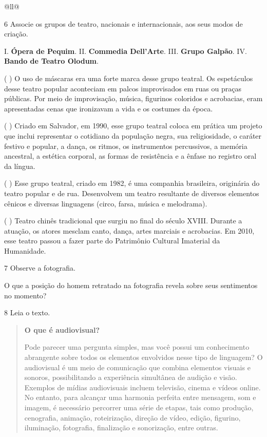\begin{itemize}
\begin{itemize}
\begin{escolha}[]{@{}ll@{}}

\num{6} Associe os grupos de teatro, nacionais e internacionais, aos seus modos de criação.

I. \textbf{Ópera de Pequim}.
II. \textbf{Commedia Dell'Arte}.
III. \textbf{Grupo Galpão}.
IV. \textbf{Bando de Teatro Olodum}.

(  ) O uso de máscaras era uma forte marca desse grupo teatral. Os
espetáculos desse teatro popular aconteciam em palcos improvisados em
ruas ou praças públicas. Por meio de improvisação, música, figurinos
coloridos e acrobacias, eram apresentadas cenas que ironizavam a vida e
os costumes da época.

(  ) Criado em Salvador, em 1990, esse grupo teatral coloca em prática um
projeto que inclui representar o cotidiano da população negra, sua
religiosidade, o caráter festivo e popular, a dança, os ritmos, os
instrumentos percussivos, a memória ancestral, a estética corporal, as
formas de resistência e a ênfase no registro oral da língua.

(  ) Esse grupo teatral, criado em 1982, é uma companhia brasileira,
originária do teatro popular e de rua. Desenvolvem um teatro resultante
de diversos elementos cênicos e diversas linguagens (circo, farsa, música e
melodrama).

(  ) Teatro chinês tradicional que surgiu no final do século XVIII. Durante a
atuação, os atores mesclam canto, dança, artes marciais e acrobacias. Em
2010, esse teatro passou a fazer parte do Patrimônio Cultural Imaterial
da Humanidade.

\num{7} Observe a fotografia.


O que a posição do homem retratado na fotografia revela sobre seus sentimentos no momento?


\num{8} Leia o texto.

\begin{quote}
\textbf{O que é audiovisual?}

Pode parecer uma pergunta simples, mas você possui um conhecimento 
abrangente sobre todos os elementos envolvidos nesse tipo de linguagem? 
O audiovisual é um meio de comunicação que combina elementos visuais e 
sonoros, possibilitando a experiência simultânea de audição e visão. 
Exemplos de mídias audiovisuais incluem televisão, cinema e vídeos online. 
No entanto, para alcançar uma harmonia perfeita entre mensagem, som e 
imagem, é necessário percorrer uma série de etapas, tais como produção, 
cenografia, animação, roteirização, direção de vídeo, edição, figurino, 
iluminação, fotografia, finalização e sonorização, entre outras.


\end{quote}
\end{escolha}
\end{itemize}
\end{itemize}
